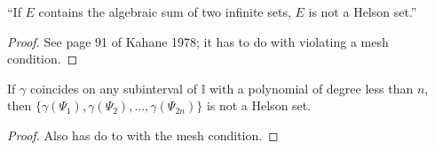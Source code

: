 \begin{lemma}
  \label{lem:not_Helson}
  ``If $E$ contains the algebraic sum of two infinite sets, $E$ is not a Helson set.''
\end{lemma}
\begin{proof}
  See page 91 of Kahane 1978; it has to do with violating a mesh condition.
\end{proof}

\begin{lemma}
  \label{lem:polynomial}
  If $\gamma$ coincides on any subinterval of $\mathbb{I}$ with a polynomial of degree less than $n$, then $\{\gamma\left(\Psi_1\right), \gamma\left(\Psi_2\right), \dots, \gamma\left(\Psi_{2n}\right)\}$ is not a Helson set.
\end{lemma}
\begin{proof}
  Also has do to with the mesh condition.
\end{proof}

